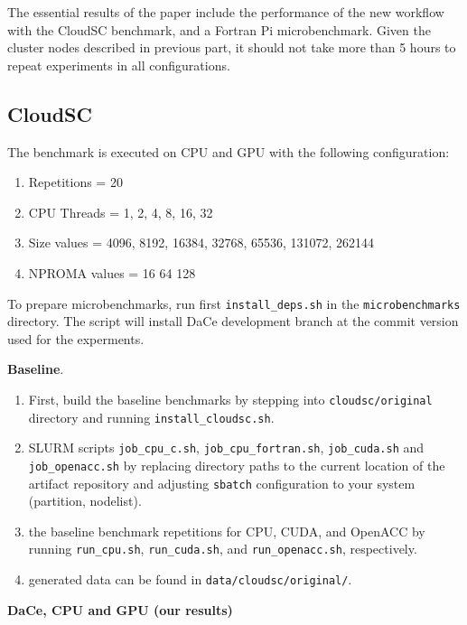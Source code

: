 \documentclass{article}
\begin{document}
The essential results of the paper include the performance of the new workflow with the CloudSC benchmark,
and a Fortran Pi microbenchmark.
Given the cluster nodes described in previous part, it should not take more than 5 hours to repeat
experiments in all configurations.

\subsection{CloudSC}

The benchmark is executed on CPU and GPU with the following configuration:
\begin{enumerate}
\item Repetitions = 20
\item CPU Threads = 1, 2, 4, 8, 16, 32
\item Size values = 4096, 8192, 16384, 32768, 65536, 131072, 262144
\item NPROMA values = 16 64 128
\end{enumerate}

To prepare microbenchmarks, run first \texttt{install\_deps.sh} in the \texttt{microbenchmarks} directory.
The script will install DaCe development branch at the commit version used for the experments.

\textbf{Baseline}.

\begin{enumerate}
\item First, build the baseline benchmarks by stepping into \texttt{cloudsc/original} directory and running
\texttt{install\_cloudsc.sh}.
\item SLURM scripts \texttt{job\_cpu\_c.sh}, \texttt{job\_cpu\_fortran.sh}, \texttt{job\_cuda.sh} and \texttt{job\_openacc.sh}
by replacing directory paths to the current location of the artifact repository and adjusting \texttt{sbatch}
configuration to your system (partition, nodelist).
\item the baseline benchmark repetitions for CPU, CUDA, and OpenACC by running
\texttt{run\_cpu.sh}, \texttt{run\_cuda.sh}, and \texttt{run\_openacc.sh}, respectively.
\item generated data can be found in \texttt{data/cloudsc/original/}.
\end{enumerate}

\textbf{DaCe, CPU and GPU (our results)}
\end{document}
